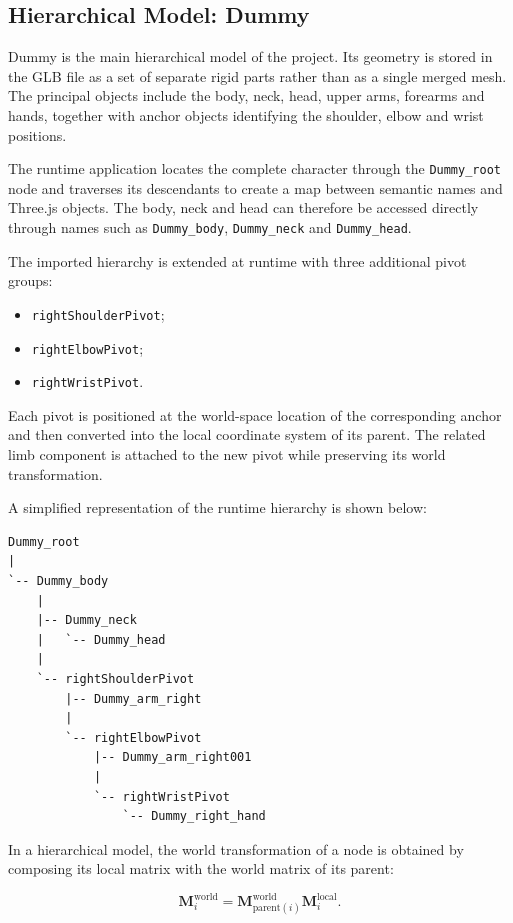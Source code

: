 \documentclass{report}
\begin{document}
\subsection{Hierarchical Model: Dummy}

Dummy is the main hierarchical model of the project. Its geometry is
stored in the GLB file as a set of separate rigid parts rather than as a
single merged mesh. The principal objects include the body, neck, head,
upper arms, forearms and hands, together with anchor objects identifying
the shoulder, elbow and wrist positions.

The runtime application locates the complete character through the
\texttt{Dummy\_root} node and traverses its descendants to create a map
between semantic names and Three.js objects. The body, neck and head can
therefore be accessed directly through names such as
\texttt{Dummy\_body}, \texttt{Dummy\_neck} and
\texttt{Dummy\_head}.

The imported hierarchy is extended at runtime with three additional
pivot groups:

\begin{itemize}
    \item \texttt{rightShoulderPivot};
    \item \texttt{rightElbowPivot};
    \item \texttt{rightWristPivot}.
\end{itemize}

Each pivot is positioned at the world-space location of the
corresponding anchor and then converted into the local coordinate system
of its parent. The related limb component is attached to the new pivot
while preserving its world transformation.

A simplified representation of the runtime hierarchy is shown below:

\begin{verbatim}
Dummy_root
|
`-- Dummy_body
    |
    |-- Dummy_neck
    |   `-- Dummy_head
    |
    `-- rightShoulderPivot
        |-- Dummy_arm_right
        |
        `-- rightElbowPivot
            |-- Dummy_arm_right001
            |
            `-- rightWristPivot
                `-- Dummy_right_hand
\end{verbatim}

In a hierarchical model, the world transformation of a node is obtained
by composing its local matrix with the world matrix of its parent:

\[
\mathbf{M}^{\mathrm{world}}_{i}
=
\mathbf{M}^{\mathrm{world}}_{\mathrm{parent}(i)}
\mathbf{M}^{\mathrm{local}}_{i}.
\]
\end{document}
